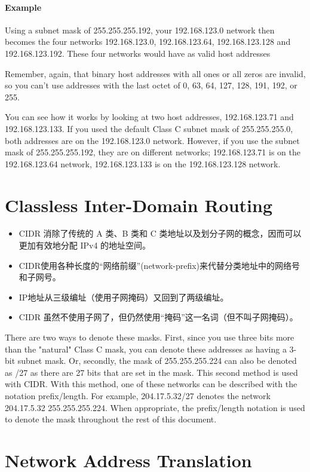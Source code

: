 \documentclass[a4paper]{report}
\begin{document}
\paragraph{Example} Using a subnet mask of 255.255.255.192, your 192.168.123.0 network then becomes the four networks 192.168.123.0, 192.168.123.64, 192.168.123.128 and 192.168.123.192. These four networks would have as valid host addresses


Remember, again, that binary host addresses with all ones or all zeros are invalid, so you can't use addresses with the last octet of 0, 63, 64, 127, 128, 191, 192, or 255.

You can see how it works by looking at two host addresses, 192.168.123.71 and 192.168.123.133. If you used the default Class C subnet mask of 255.255.255.0, both addresses are on the 192.168.123.0 network. However, if you use the subnet mask of 255.255.255.192, they are on different networks; 192.168.123.71 is on the 192.168.123.64 network, 192.168.123.133 is on the 192.168.123.128 network.

\section{Classless Inter-Domain Routing}
\begin{itemize}
  \item CIDR 消除了传统的 A 类、B 类和 C 类地址以及划分子网的概念，因而可以更加有效地分配 IPv4 的地址空间。
  \item CIDR使用各种长度的“网络前缀”(network-prefix)来代替分类地址中的网络号和子网号。
  \item IP地址从三级编址（使用子网掩码）又回到了两级编址。  
  \item CIDR 虽然不使用子网了，但仍然使用“掩码”这一名词（但不叫子网掩码）。
\end{itemize}


There are two ways to denote these masks. First, since you use three bits more than the "natural" Class C mask, you can denote these addresses as having a 3-bit subnet mask. Or, secondly, the mask of 255.255.255.224 can also be denoted as /27 as there are 27 bits that are set in the mask. This second method is used with CIDR. With this method, one of these networks can be described with the notation prefix/length. For example, 204.17.5.32/27 denotes the network 204.17.5.32 255.255.255.224. When appropriate, the prefix/length notation is used to denote the mask throughout the rest of this document.

\section{Network Address Translation}
\end{document}
